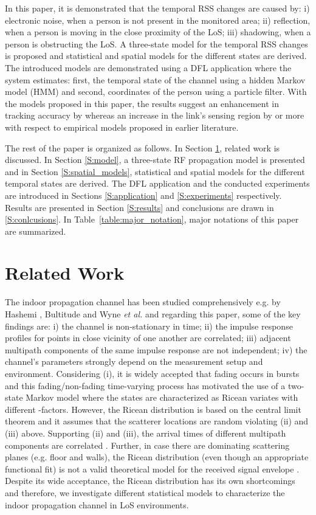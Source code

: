 \documentclass[journal, 10pt, twocolumn, balance]{IEEEtran}
\begin{document}
In this paper, it is demonstrated that the temporal RSS changes are caused by: i) electronic noise, when a person is not present in the monitored area; ii) reflection, when a person is moving in the close proximity of the LoS; iii) shadowing, when a person is obstructing the LoS. A three-state model for the temporal RSS changes is proposed and statistical and spatial models for the different states are derived. The introduced models are demonstrated using a DFL application where the system estimates: first, the temporal state of the channel using a hidden Markov model (HMM) and second, coordinates of the person using a particle filter. With the models proposed in this paper, the results suggest an enhancement in tracking accuracy by  whereas an increase in the link's sensing region by  or more with respect to empirical models proposed in earlier literature.

The rest of the paper is organized as follows. In Section \ref{S:related_work}, related work is discussed. In Section \ref{S:model}, a three-state RF propagation model is presented and in Section \ref{S:spatial_models}, statistical and spatial models for the different temporal states are derived. The DFL application and the conducted experiments are introduced in Sections \ref{S:application} and \ref{S:experiments} respectively. Results are presented in Section \ref{S:results} and conclusions are drawn in \ref{S:conlcusions}. In Table~\ref{table:major_notation}, major notations of this paper are summarized.

\section{Related Work} \label{S:related_work}
The indoor propagation channel has been studied comprehensively e.g. by Hashemi \cite{hashemi93}, Bultitude \cite{bultitude1987} and Wyne \emph{et al.} \cite{Wyne2009} and regarding this paper, some of the key findings are: i) the channel is non-stationary in time; ii) the impulse response profiles for points in close vicinity of one another are correlated; iii) adjacent multipath components of the same impulse response are not independent; iv) the channel's parameters strongly depend on the measurement setup and environment. Considering (i), it is widely accepted that fading occurs in bursts \cite{bultitude1987} and this fading/non-fading time-varying process has motivated the use of a two-state Markov model \cite{roberts1995} where the states are characterized as Ricean variates with different -factors. However, the Ricean distribution is based on the central limit theorem and it assumes that the scatterer locations are random violating (ii) and (iii) above. Supporting (ii) and (iii), the arrival times of different multipath components are correlated \cite{hashemi93}. Further, in case there are dominating scattering planes (e.g. floor and walls), the Ricean distribution (even though an appropriate functional fit) is not a valid theoretical model for the received signal envelope \cite{Wyne2009}. Despite its wide acceptance, the Ricean distribution has its own shortcomings and therefore, we investigate different statistical models to characterize the indoor propagation channel in LoS environments.
\end{document}

